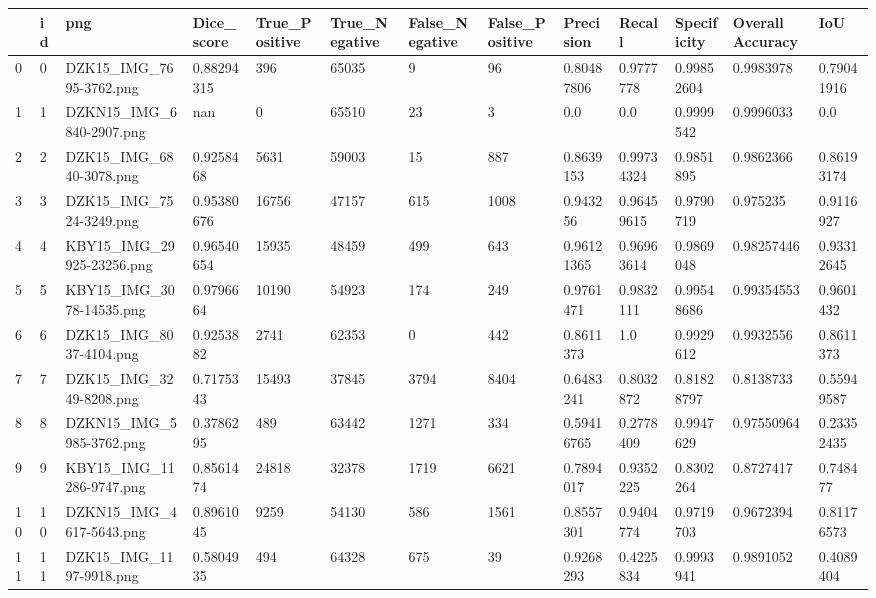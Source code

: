 \documentclass[11pt, a4paper, twoside]{report}
\begin{document}
\begin{longtable}[c]{@{}lllllllllllll@{}}
\toprule
 & id & png & Dice\_score & True\_Positive & True\_Negative & False\_Negative & False\_Positive & Precision & Recall & Specificity & Overall Accuracy & IoU \\* \midrule
\endhead
%
\bottomrule
\endfoot
%
\endlastfoot
%
0 & 0 & DZK15\_IMG\_7695-3762.png & 0.88294315 & 396 & 65035 & 9 & 96 & 0.80487806 & 0.9777778 & 0.99852604 & 0.9983978 & 0.79041916 \\
1 & 1 & DZKN15\_IMG\_6840-2907.png & nan & 0 & 65510 & 23 & 3 & 0.0 & 0.0 & 0.9999542 & 0.9996033 & 0.0 \\
2 & 2 & DZK15\_IMG\_6840-3078.png & 0.9258468 & 5631 & 59003 & 15 & 887 & 0.8639153 & 0.99734324 & 0.9851895 & 0.9862366 & 0.86193174 \\
3 & 3 & DZK15\_IMG\_7524-3249.png & 0.95380676 & 16756 & 47157 & 615 & 1008 & 0.943256 & 0.96459615 & 0.9790719 & 0.975235 & 0.9116927 \\
4 & 4 & KBY15\_IMG\_29925-23256.png & 0.96540654 & 15935 & 48459 & 499 & 643 & 0.96121365 & 0.96963614 & 0.9869048 & 0.98257446 & 0.93312645 \\
5 & 5 & KBY15\_IMG\_3078-14535.png & 0.9796664 & 10190 & 54923 & 174 & 249 & 0.9761471 & 0.9832111 & 0.99548686 & 0.99354553 & 0.9601432 \\
6 & 6 & DZK15\_IMG\_8037-4104.png & 0.9253882 & 2741 & 62353 & 0 & 442 & 0.8611373 & 1.0 & 0.9929612 & 0.9932556 & 0.8611373 \\
7 & 7 & DZK15\_IMG\_3249-8208.png & 0.7175343 & 15493 & 37845 & 3794 & 8404 & 0.6483241 & 0.8032872 & 0.81828797 & 0.8138733 & 0.55949587 \\
8 & 8 & DZKN15\_IMG\_5985-3762.png & 0.3786295 & 489 & 63442 & 1271 & 334 & 0.59416765 & 0.2778409 & 0.9947629 & 0.97550964 & 0.23352435 \\
9 & 9 & KBY15\_IMG\_11286-9747.png & 0.8561474 & 24818 & 32378 & 1719 & 6621 & 0.7894017 & 0.9352225 & 0.8302264 & 0.8727417 & 0.748477 \\
10 & 10 & DZKN15\_IMG\_4617-5643.png & 0.8961045 & 9259 & 54130 & 586 & 1561 & 0.8557301 & 0.9404774 & 0.9719703 & 0.9672394 & 0.81176573 \\
11 & 11 & DZK15\_IMG\_1197-9918.png & 0.5804935 & 494 & 64328 & 675 & 39 & 0.9268293 & 0.4225834 & 0.9993941 & 0.9891052 & 0.4089404 \\

\end{longtable}
\end{document}

